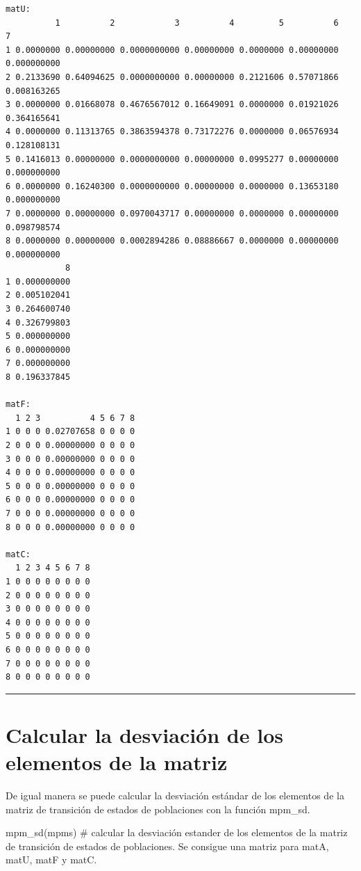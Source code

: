 \documentclass[
  12pt,
  letterpaper,
]{book}
\newenvironment{Shaded}{\begin{snugshade}}{\end{snugshade}}
\newcommand{\CommentTok}[1]{\textcolor[rgb]{0.37,0.37,0.37}{#1}}
\newcommand{\FunctionTok}[1]{\textcolor[rgb]{0.28,0.35,0.67}{#1}}
\newcommand{\NormalTok}[1]{\textcolor[rgb]{0.00,0.23,0.31}{#1}}
\begin{document}
\begin{verbatim}
matU:
          1          2            3          4         5          6           7
1 0.0000000 0.00000000 0.0000000000 0.00000000 0.0000000 0.00000000 0.000000000
2 0.2133690 0.64094625 0.0000000000 0.00000000 0.2121606 0.57071866 0.008163265
3 0.0000000 0.01668078 0.4676567012 0.16649091 0.0000000 0.01921026 0.364165641
4 0.0000000 0.11313765 0.3863594378 0.73172276 0.0000000 0.06576934 0.128108131
5 0.1416013 0.00000000 0.0000000000 0.00000000 0.0995277 0.00000000 0.000000000
6 0.0000000 0.16240300 0.0000000000 0.00000000 0.0000000 0.13653180 0.000000000
7 0.0000000 0.00000000 0.0970043717 0.00000000 0.0000000 0.00000000 0.098798574
8 0.0000000 0.00000000 0.0002894286 0.08886667 0.0000000 0.00000000 0.000000000
            8
1 0.000000000
2 0.005102041
3 0.264600740
4 0.326799803
5 0.000000000
6 0.000000000
7 0.000000000
8 0.196337845

matF:
  1 2 3          4 5 6 7 8
1 0 0 0 0.02707658 0 0 0 0
2 0 0 0 0.00000000 0 0 0 0
3 0 0 0 0.00000000 0 0 0 0
4 0 0 0 0.00000000 0 0 0 0
5 0 0 0 0.00000000 0 0 0 0
6 0 0 0 0.00000000 0 0 0 0
7 0 0 0 0.00000000 0 0 0 0
8 0 0 0 0.00000000 0 0 0 0

matC:
  1 2 3 4 5 6 7 8
1 0 0 0 0 0 0 0 0
2 0 0 0 0 0 0 0 0
3 0 0 0 0 0 0 0 0
4 0 0 0 0 0 0 0 0
5 0 0 0 0 0 0 0 0
6 0 0 0 0 0 0 0 0
7 0 0 0 0 0 0 0 0
8 0 0 0 0 0 0 0 0
\end{verbatim}

\begin{center}\rule{0.5\linewidth}{0.5pt}\end{center}

\section{Calcular la desviación de los elementos de la
matriz}\label{calcular-la-desviaciuxf3n-de-los-elementos-de-la-matriz}

De igual manera se puede calcular la desviación estándar de los
elementos de la matriz de transición de estados de poblaciones con la
función mpm\_sd.

\begin{Shaded}
\begin{Highlighting}[]
\FunctionTok{mpm\_sd}\NormalTok{(mpms) }\CommentTok{\# calcular la desviación estander de los elementos de la matriz de transición de estados de poblaciones. Se consigue una matriz para matA, matU, matF y matC.}
\end{Highlighting}
\end{Shaded}
\end{document}
